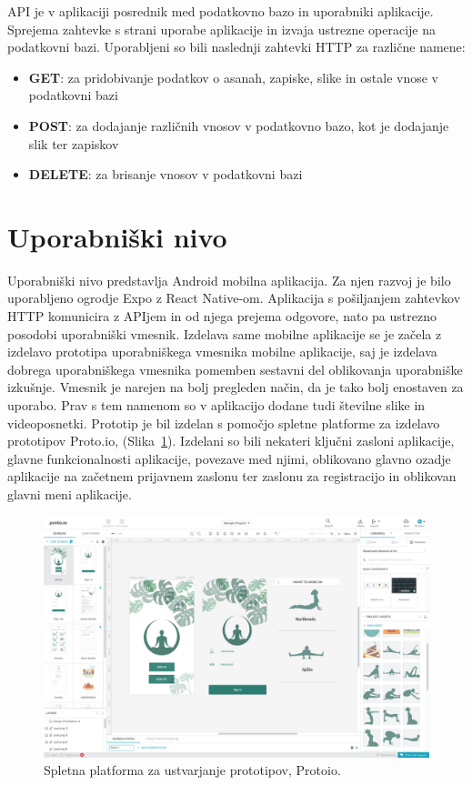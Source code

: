 \documentclass[a4paper, 12pt]{book}
\begin{document}
API je v aplikaciji posrednik med podatkovno bazo in uporabniki aplikacije. Sprejema zahtevke s strani uporabe aplikacije in izvaja ustrezne operacije na podatkovni bazi. Uporabljeni so bili naslednji zahtevki HTTP za različne namene:

 \begin{itemize}
  \item \textbf{GET}: za pridobivanje podatkov o asanah, zapiske, slike in ostale vnose v podatkovni bazi
  \item \textbf{POST}: za dodajanje različnih vnosov v podatkovno bazo, kot je dodajanje slik ter zapiskov
  \item \textbf{DELETE}: za brisanje vnosov v podatkovni bazi
\end{itemize}

\section{Uporabniški nivo}
Uporabniški nivo predstavlja Android mobilna aplikacija. Za njen razvoj je bilo uporabljeno ogrodje Expo z React Native-om. Aplikacija s pošiljanjem zahtevkov HTTP komunicira z APIjem in od njega prejema odgovore, nato pa ustrezno posodobi uporabniški vmesnik.
Izdelava same mobilne aplikacije se je začela z izdelavo prototipa uporabniškega vmesnika mobilne aplikacije, saj je izdelava dobrega uporabniškega vmesnika pomemben sestavni del oblikovanja uporabniške izkušnje. Vmesnik je narejen na bolj pregleden način, da je tako bolj enostaven za uporabo. Prav s tem namenom so v aplikacijo dodane tudi številne slike in videoposnetki.
Prototip je bil izdelan s pomočjo spletne platforme za izdelavo prototipov Proto.io, (Slika~\ref{protoio}). Izdelani so bili nekateri ključni zasloni aplikacije, glavne funkcionalnosti aplikacije, povezave med njimi, oblikovano glavno ozadje aplikacije na začetnem prijavnem zaslonu ter zaslonu za registracijo in oblikovan glavni meni aplikacije.

\begin{figure}[ht]
\begin{center}
\includegraphics[scale=.23]{protoio.png}
\end{center}
\caption{Spletna platforma za ustvarjanje prototipov, Protoio.}
\label{protoio}
\end{figure}
\end{document}
